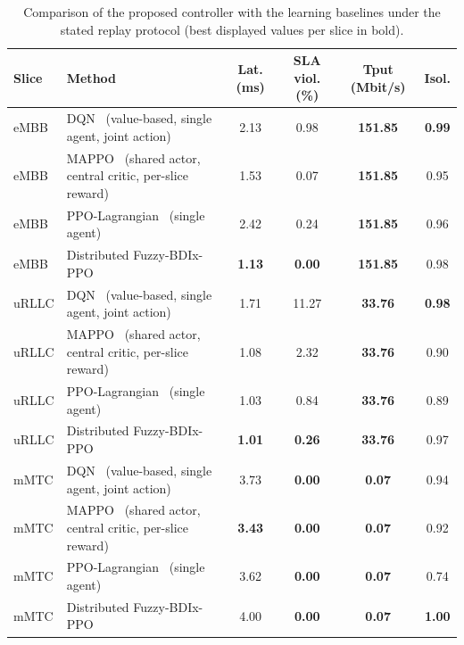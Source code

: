 \begin{table}[!t]
\centering
\caption{Comparison of the proposed controller with the learning baselines under the stated replay protocol (best displayed values per slice in bold).}
\label{tab:sota_comparison}
\footnotesize
\begin{tabular}{llcccc}
\toprule
\textbf{Slice} & \textbf{Method} & \textbf{Lat. (ms)} & \textbf{SLA viol. (\%)} & \textbf{Tput (Mbit/s)} & \textbf{Isol.} \\
\midrule
eMBB & DQN~\cite{mnih2015dqn} (value-based, single agent, joint action) & 2.13 & 0.98 & \textbf{151.85} & \textbf{0.99} \\
eMBB & MAPPO~\cite{yu2022mappo} (shared actor, central critic, per-slice reward) & 1.53 & 0.07 & \textbf{151.85} & 0.95 \\
eMBB & PPO-Lagrangian~\cite{ray2019safe,stooke2020pid} (single agent) & 2.42 & 0.24 & \textbf{151.85} & 0.96 \\
eMBB & Distributed Fuzzy-BDIx-PPO & \textbf{1.13} & \textbf{0.00} & \textbf{151.85} & 0.98 \\
\midrule
uRLLC & DQN~\cite{mnih2015dqn} (value-based, single agent, joint action) & 1.71 & 11.27 & \textbf{33.76} & \textbf{0.98} \\
uRLLC & MAPPO~\cite{yu2022mappo} (shared actor, central critic, per-slice reward) & 1.08 & 2.32 & \textbf{33.76} & 0.90 \\
uRLLC & PPO-Lagrangian~\cite{ray2019safe,stooke2020pid} (single agent) & 1.03 & 0.84 & \textbf{33.76} & 0.89 \\
uRLLC & Distributed Fuzzy-BDIx-PPO & \textbf{1.01} & \textbf{0.26} & \textbf{33.76} & 0.97 \\
\midrule
mMTC & DQN~\cite{mnih2015dqn} (value-based, single agent, joint action) & 3.73 & \textbf{0.00} & \textbf{0.07} & 0.94 \\
mMTC & MAPPO~\cite{yu2022mappo} (shared actor, central critic, per-slice reward) & \textbf{3.43} & \textbf{0.00} & \textbf{0.07} & 0.92 \\
mMTC & PPO-Lagrangian~\cite{ray2019safe,stooke2020pid} (single agent) & 3.62 & \textbf{0.00} & \textbf{0.07} & 0.74 \\
mMTC & Distributed Fuzzy-BDIx-PPO & 4.00 & \textbf{0.00} & \textbf{0.07} & \textbf{1.00} \\
\bottomrule
\end{tabular}
\end{table}
